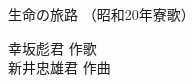 \documentclass[10pt,b5j]{tarticle} %
\begin{document}
\begin{minipage}[c]{0.7\hsize} %
    \begin{center}
        {\LARGE
            生命の旅路 %
        }
        {\small 
            （昭和20年寮歌） %
        }
    \end{center}
\end{minipage}
\begin{minipage}[c]{0.3\hsize} %
    \begin{flushright} %
        幸坂彪君 作歌\\新井忠雄君 作曲 %
    \end{flushright}
\end{minipage}
\end{document}
